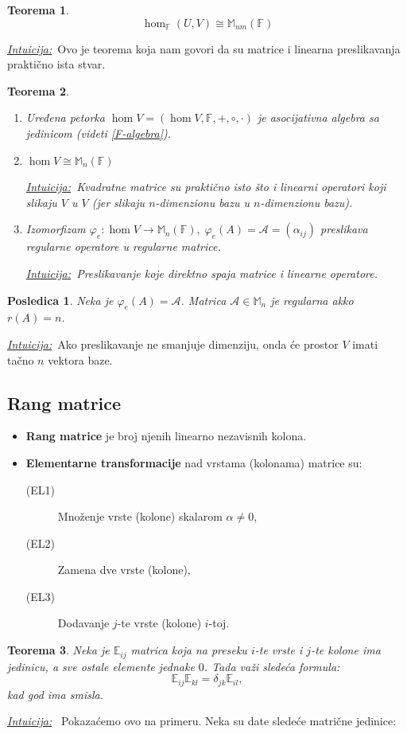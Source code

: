 \documentclass[a4paper,12pt,twoside]{report}
\newtheorem{theorem}{Teorema}[section]
\newtheorem{corollary}{Posledica}[theorem]
\numberwithin{algorithm}{section}
\newcommand{\intuicija}{\noindent\underline{\textit{Intuicija:}}\ }
\begin{document}
\begin{theorem} \label{matriceHomomorfizmiIzomorfni}
    \[ \hom_\mathbb{F}(U, V) \cong \mathbb{M}_{nm}(\mathbb{F}) \]
\end{theorem}

\intuicija Ovo je teorema koja nam govori da su matrice i linearna preslikavanja praktično ista stvar.

\begin{theorem}\
    \begin{enumerate}
        \item Uređena petorka $\hom V = (\hom V, \mathbb{F}, +, \circ, \cdot)$ je asocijativna algebra sa jedinicom (videti \ref{F-algebra}).
        \item $\hom V \cong \mathbb{M}_n(\mathbb{F})$
        
        \intuicija Kvadratne matrice su praktično isto što i linearni operatori koji slikaju $V$ u $V$ (jer slikaju $n$-dimenzionu bazu u $n$-dimenzionu bazu).
        \item Izomorfizam $\varphi_e: \hom V \to \mathbb{M}_n(\mathbb{F}), \; \varphi_e(A) = \mathcal{A} = (\alpha_{ij})$ preslikava regularne operatore u regularne matrice.
        
        \intuicija Preslikavanje koje direktno spaja matrice i linearne operatore.
    \end{enumerate}
\end{theorem}

\begin{corollary}
    Neka je $\varphi_e(A) = \mathcal{A}$. Matrica $\mathcal{A} \in \mathbb{M}_n$ je regularna akko $r(A) = n$.
\end{corollary}

\intuicija Ako preslikavanje ne smanjuje dimenziju, onda će prostor $V$ imati tačno $n$ vektora baze.
\newpage

\subsection{Rang matrice}
\vfill
\begin{itemize}
    \item \textbf{Rang matrice} je broj njenih linearno nezavisnih kolona.
    \vfill
    \item \textbf{Elementarne transformacije} nad vrstama (kolonama) matrice su:
    \begin{description}
        \item [(EL1)] Množenje vrste (kolone) skalarom $\alpha \neq 0$,
        \item [(EL2)] Zamena dve vrste (kolone),
        \item [(EL3)] Dodavanje $j$-te vrste (kolone) $i$-toj.
    \end{description}
\end{itemize}
\vfill
\begin{theorem}
    Neka je $\mathbb{E}_{ij}$ matrica koja na preseku $i$-te vrste i $j$-te kolone ima jedinicu, a sve ostale elemente jednake $0$. Tada važi sledeća formula:
    \[ \mathbb{E}_{ij} \mathbb{E}_{kl} = \delta_{jk} \mathbb{E}_{il}, \]
    kad god ima smisla.
\end{theorem}
\vfill
\intuicija
Pokazaćemo ovo na primeru. Neka su date sledeće matrične jedinice:
\end{document}
